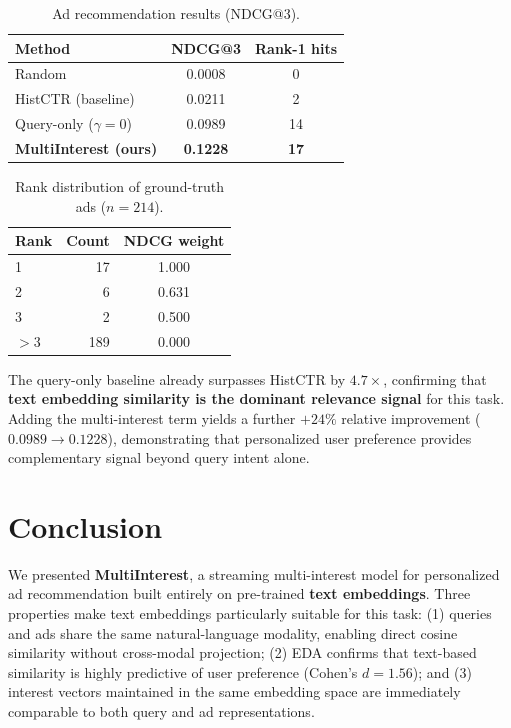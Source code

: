 \documentclass[10pt,twocolumn]{article}
\begin{document}
\begin{table}[h]
\centering
\caption{Ad recommendation results (NDCG@3).}
\label{tab:results}
\small
\begin{tabular}{lcc}
\toprule
Method & NDCG@3 & Rank-1 hits \\
\midrule
Random & 0.0008 & 0 \\
HistCTR (baseline) & 0.0211 & 2 \\
Query-only ($\gamma\!=\!0$) & 0.0989 & 14 \\
\textbf{MultiInterest (ours)} & \textbf{0.1228} & \textbf{17} \\
\bottomrule
\end{tabular}
\end{table}

\begin{table}[h]
\centering
\caption{Rank distribution of ground-truth ads ($n\!=\!214$).}
\label{tab:rankdist}
\small
\begin{tabular}{lrc}
\toprule
Rank & Count & NDCG weight \\
\midrule
1       & 17  & 1.000 \\
2       & 6   & 0.631 \\
3       & 2   & 0.500 \\
$> 3$ & 189 & 0.000 \\
\bottomrule
\end{tabular}
\end{table}

The query-only baseline already surpasses HistCTR by $4.7\times$,
confirming that \textbf{text embedding similarity is the dominant
relevance signal} for this task.
Adding the multi-interest term yields a further $+24\%$ relative
improvement ($0.0989 \to 0.1228$), demonstrating that personalized
user preference provides complementary signal beyond query intent alone.

\section{Conclusion}
\label{sec:conclusion}

We presented \textbf{MultiInterest}, a streaming multi-interest model
for personalized ad recommendation built entirely on pre-trained
\textbf{text embeddings}.
Three properties make text embeddings particularly suitable for this task:
(1) queries and ads share the same natural-language modality, enabling
direct cosine similarity without cross-modal projection;
(2) EDA confirms that text-based similarity is highly predictive of
user preference (Cohen's $d = 1.56$);
and (3) interest vectors maintained in the same embedding space are
immediately comparable to both query and ad representations.
\end{document}

